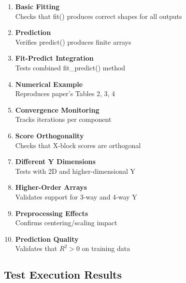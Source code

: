 \documentclass[12pt,a4paper]{article}
\begin{document}
\begin{enumerate}
    \item \textbf{Basic Fitting} \\
    Checks that fit() produces correct shapes for all outputs

    \item \textbf{Prediction} \\
    Verifies predict() produces finite arrays

    \item \textbf{Fit-Predict Integration} \\
    Tests combined fit\_predict() method

    \item \textbf{Numerical Example} \\
    Reproduces paper's Tables 2, 3, 4

    \item \textbf{Convergence Monitoring} \\
    Tracks iterations per component

    \item \textbf{Score Orthogonality} \\
    Checks that X-block scores are orthogonal

    \item \textbf{Different Y Dimensions} \\
    Tests with 2D and higher-dimensional Y

    \item \textbf{Higher-Order Arrays} \\
    Validates support for 3-way and 4-way Y

    \item \textbf{Preprocessing Effects} \\
    Confirms centering/scaling impact

    \item \textbf{Prediction Quality} \\
    Validates that $R^2 > 0$ on training data
\end{enumerate}

\subsection{Test Execution Results}
\end{document}
